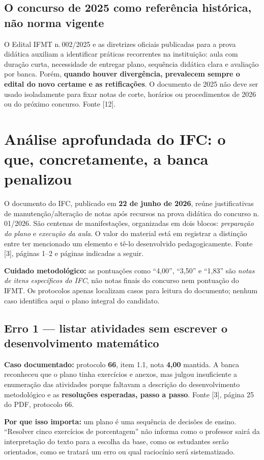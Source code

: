 \documentclass[11pt,a4paper]{article}
\begin{document}
\subsection{O concurso de 2025 como referência histórica, não norma vigente}
O Edital IFMT n.\,002/2025 e as diretrizes oficiais publicadas para a prova didática auxiliam a identificar práticas recorrentes na instituição: aula com duração curta, necessidade de entregar plano, sequência didática clara e avaliação por banca. Porém, \textbf{quando houver divergência, prevalecem sempre o edital do novo certame e as retificações}. O documento de 2025 não deve ser usado isoladamente para fixar notas de corte, horários ou procedimentos de 2026 ou do próximo concurso. Fonte [12].

\section{Análise aprofundada do IFC: o que, concretamente, a banca penalizou}
O documento do IFC, publicado em \textbf{22 de junho de 2026}, reúne justificativas de manutenção/alteração de notas após recursos na prova didática do concurso n.\,01/2026. São centenas de manifestações, organizadas em dois blocos: \textit{preparação do plano} e \textit{execução da aula}. O valor do material está em registrar a distinção entre ter mencionado um elemento e tê-lo desenvolvido pedagogicamente. Fonte [3], páginas 1--2 e páginas indicadas a seguir.

\textbf{Cuidado metodológico:} as pontuações como ``4,00'', ``3,50'' e ``1,83'' são \textit{notas de itens específicos do IFC}, não notas finais do concurso nem pontuação do IFMT. Os protocolos apenas localizam casos para leitura do documento; nenhum caso identifica aqui o plano integral do candidato.

\subsection{Erro 1 --- listar atividades sem escrever o desenvolvimento matemático}
\textbf{Caso documentado:} protocolo \textbf{66}, item 1.1, nota \textbf{4,00} mantida. A banca reconheceu que o plano tinha exercícios e anexos, mas julgou insuficiente a enumeração das atividades porque faltavam a descrição do desenvolvimento metodológico e as \textbf{resoluções esperadas, passo a passo}. Fonte [3], página 25 do PDF, protocolo 66.

\textbf{Por que isso importa:} um plano é uma sequência de decisões de ensino. ``Resolver cinco exercícios de porcentagem'' não informa como o professor sairá da interpretação do texto para a escolha da base, como os estudantes serão orientados, como se tratará um erro ou qual raciocínio será sistematizado.
\end{document}
